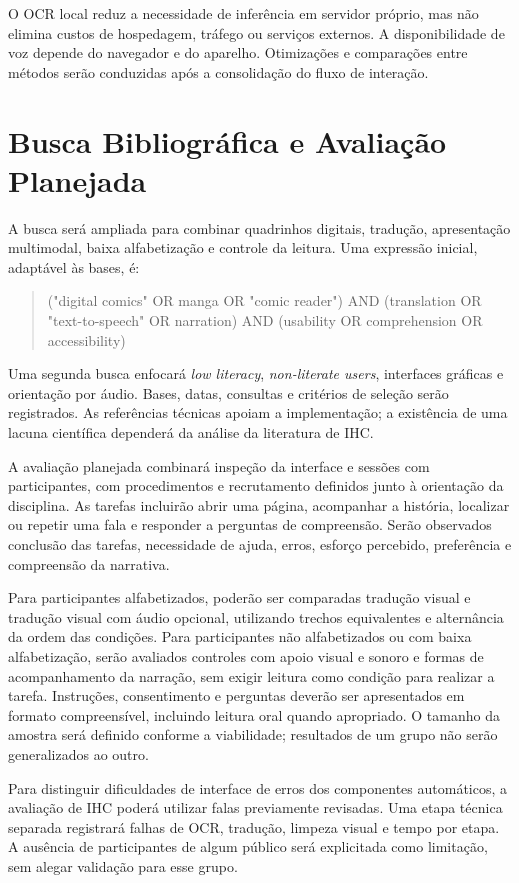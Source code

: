 \documentclass[conference]{IEEEtran}
\begin{document}
O OCR local reduz a necessidade de inferência em servidor próprio, mas não elimina custos de hospedagem, tráfego ou serviços externos. A disponibilidade de voz depende do navegador e do aparelho. Otimizações e comparações entre métodos serão conduzidas após a consolidação do fluxo de interação.

\section{Busca Bibliográfica e Avaliação Planejada}
A busca será ampliada para combinar quadrinhos digitais, tradução, apresentação multimodal, baixa alfabetização e controle da leitura. Uma expressão inicial, adaptável às bases, é:

\begin{quote}
\ttfamily\small
("digital comics" OR manga OR "comic reader") AND (translation OR "text-to-speech" OR narration) AND (usability OR comprehension OR accessibility)
\end{quote}

Uma segunda busca enfocará \emph{low literacy}, \emph{non-literate users}, interfaces gráficas e orientação por áudio. Bases, datas, consultas e critérios de seleção serão registrados. As referências técnicas apoiam a implementação; a existência de uma lacuna científica dependerá da análise da literatura de IHC.

A avaliação planejada combinará inspeção da interface e sessões com participantes, com procedimentos e recrutamento definidos junto à orientação da disciplina. As tarefas incluirão abrir uma página, acompanhar a história, localizar ou repetir uma fala e responder a perguntas de compreensão. Serão observados conclusão das tarefas, necessidade de ajuda, erros, esforço percebido, preferência e compreensão da narrativa.

Para participantes alfabetizados, poderão ser comparadas tradução visual e tradução visual com áudio opcional, utilizando trechos equivalentes e alternância da ordem das condições. Para participantes não alfabetizados ou com baixa alfabetização, serão avaliados controles com apoio visual e sonoro e formas de acompanhamento da narração, sem exigir leitura como condição para realizar a tarefa. Instruções, consentimento e perguntas deverão ser apresentados em formato compreensível, incluindo leitura oral quando apropriado. O tamanho da amostra será definido conforme a viabilidade; resultados de um grupo não serão generalizados ao outro.

Para distinguir dificuldades de interface de erros dos componentes automáticos, a avaliação de IHC poderá utilizar falas previamente revisadas. Uma etapa técnica separada registrará falhas de OCR, tradução, limpeza visual e tempo por etapa. A ausência de participantes de algum público será explicitada como limitação, sem alegar validação para esse grupo.
\end{document}
